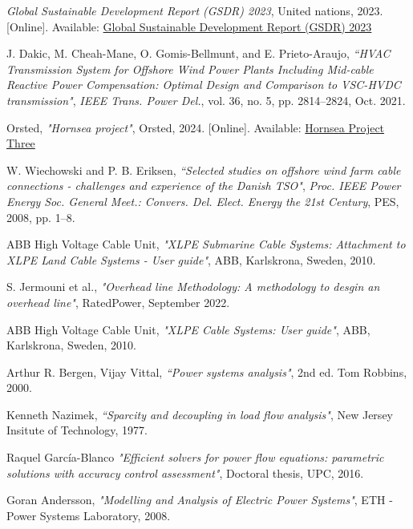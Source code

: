 \documentclass[a4paper,11pt, titlepage, twoside]{article}
\begin{document}
 \begin{thebibliography}{99}\label{biblio}
 

 \textit{Global Sustainable Development Report (GSDR) 2023}, United nations, 2023. [Online]. 
 Available: \href{https://sdgs.un.org/gsdr/gsdr2023}{Global Sustainable Development Report (GSDR) 2023}
 
 {J. Dakic, M. Cheah-Mane, O. Gomis-Bellmunt, and E. Prieto-Araujo},
\textit{“HVAC Transmission System for Offshore Wind Power Plants Including
 Mid-cable Reactive Power Compensation: Optimal Design and Comparison to VSC-HVDC transmission"}, \textit{IEEE Trans. Power Del.}, vol. 36,
 no. 5, pp. 2814–2824, Oct. 2021.

{Orsted},
\textit{"Hornsea project"}, Orsted, 2024. [Online]. Available: \href{https://hornseaproject3.co.uk/about-the-project}{Hornsea Project Three}


 {W. Wiechowski and P. B. Eriksen},
\textit{“Selected studies on offshore wind farm
cable connections - challenges and experience of the Danish TSO"}, \textit{Proc.
IEEE Power Energy Soc. General Meet.: Convers. Del. Elect. Energy the
21st Century}, PES, 2008, pp. 1–8.

{ABB High Voltage Cable Unit},
\textit{"XLPE Submarine Cable Systems: Attachment to XLPE Land Cable Systems - User guide"}, ABB, Karlskrona, Sweden, 2010.


{S. Jermouni et al.},
\textit{"Overhead line Methodology: A methodology to desgin an overhead line"}, RatedPower, September 2022.

{ABB High Voltage Cable Unit},
\textit{"XLPE Cable Systems: User guide"}, ABB, Karlskrona, Sweden, 2010.


 {Arthur R. Bergen, Vijay Vittal},
\textit{“Power systems analysis"}, 2nd ed. Tom Robbins, 2000.

{Kenneth Nazimek},
\textit{“Sparcity and decoupling in load flow analysis"}, New Jersey Insitute of Technology, 1977.

{ Raquel García-Blanco}
\textit{"Efficient solvers for power flow equations: parametric solutions with accuracy control assessment"}, Doctoral thesis, UPC, 2016.


{Goran Andersson},
\textit{"Modelling and Analysis of Electric Power Systems"}, ETH - Power Systems Laboratory, 2008.


\end{thebibliography}
\end{document}
